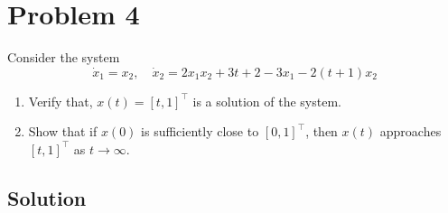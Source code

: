 \section*{Problem 4}

Consider the system
\begin{equation*}
    \dot{x}_{1}=x_{2}, \quad \dot{x}_{2}=2 x_{1} x_{2}+3 t+2-3 x_{1}-2(t+1) x_{2}
\end{equation*}
\begin{enumerate}[label= (\alph*)]
    \item Verify that, \( x(t)=[t, 1]^{\top} \) is a solution of the system.
    \item Show that if \( x(0) \) is sufficiently close to \( [0,1]^{\top} \), then \( x(t) \) approaches \( [t, 1]^{\top} \) as \( t \rightarrow \infty \).
\end{enumerate}

\subsection*{Solution}
